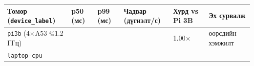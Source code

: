 \begingroup\scriptsize\begin{longtable}[]{@{}llllll@{}}
\toprule
\begin{minipage}[b]{0.14\columnwidth}\raggedright
Төмөр (\texttt{device\_label})\strut
\end{minipage} & \begin{minipage}[b]{0.14\columnwidth}\raggedright
p50 (мс)\strut
\end{minipage} & \begin{minipage}[b]{0.14\columnwidth}\raggedright
p99 (мс)\strut
\end{minipage} & \begin{minipage}[b]{0.14\columnwidth}\raggedright
Чадвар (дүгнэлт/с)\strut
\end{minipage} & \begin{minipage}[b]{0.14\columnwidth}\raggedright
Хурд vs Pi 3B\strut
\end{minipage} & \begin{minipage}[b]{0.14\columnwidth}\raggedright
Эх сурвалж\strut
\end{minipage}\tabularnewline
\midrule
\endhead
\begin{minipage}[t]{0.14\columnwidth}\raggedright
\texttt{pi3b} (4×A53 @1.2 ГГц)\strut
\end{minipage} & \begin{minipage}[t]{0.14\columnwidth}\raggedright
\strut
\end{minipage} & \begin{minipage}[t]{0.14\columnwidth}\raggedright
\strut
\end{minipage} & \begin{minipage}[t]{0.14\columnwidth}\raggedright
\strut
\end{minipage} & \begin{minipage}[t]{0.14\columnwidth}\raggedright
1.00×\strut
\end{minipage} & \begin{minipage}[t]{0.14\columnwidth}\raggedright
өөрсдийн хэмжилт\strut
\end{minipage}\tabularnewline
\begin{minipage}[t]{0.14\columnwidth}\raggedright
\texttt{laptop-cpu}\strut
\end{minipage} & \begin{minipage}[t]{0.14\columnwidth}\raggedright
\strut
\end{minipage} & \begin{minipage}[t]{0.14\columnwidth}\raggedright
\strut
\end{minipage} & \begin{minipage}[t]{0.14\columnwidth}\raggedright

\end{minipage}
\end{longtable}
